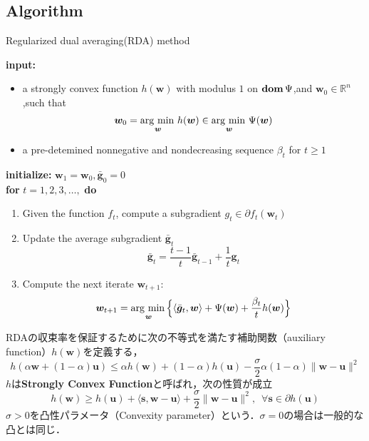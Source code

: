 \documentclass[a4paper,11pt]{jsarticle}
\numberwithin{theorem}{section}  %
\numberwithin{equation}{section} %
\newcommand{\argmin}{\mathop{\rm arg~min\,}\limits}
\newcommand{\dom}{\mathop{\mathrm{\bf dom}}\nolimits}
\begin{document}
\subsection{Algorithm}
\begin{algorithm}[H]
\caption{Regularized dual averaging(RDA) method}
\label{RDAA}
\textbf{input:}
\begin{itemize}
\item a strongly convex function $h(\bm{w})$ with modulus $1$ on $\dom \Psi$,and $\bm{w}_0 \in \mathbb{R}^n$,such that
\begin{equation}
\bm{w}_0 = \argmin_{\bm{w}} h(\bm{w}) \in \argmin_{\bm{w}} \Psi(\bm{w})
\end{equation}
\item a pre-detemined nonnegative and nondecreasing sequence $\beta_t$ for $t \ge 1$
\end{itemize}
\textbf{initialize:} $\bm{w}_1 = \bm{w}_0, \bar{\bm{g}}_0 = 0$\\
\textbf{for} $t=1,2,3,\dots,$ \textbf{do}
\begin{enumerate}
\item Given the function $f_t$, compute a subgradient $g_t \in \partial f_t(\bm{w}_t)$
\item Update the average subgradient $\bar{\bm{g}}_t$
\begin{equation}
\bar{\bm{g}}_t = \frac{t-1}{t} \bar{\bm{g}}_{t-1} + \frac{1}{t}\bm{g}_t
\end{equation}
\item Compute the next iterate $\bm{w}_{t+1}$:
\begin{equation}
\bm{w}_{t+1} = \argmin_{\bm{w}}\Bigr\{\langle \bar{\bm{g}}_t, \bm{w} \rangle + \Psi(\bm{w}) + \frac{\beta_t}{t} h(\bm{w}) \Bigr\} \label{EQU8}
\end{equation}
\end{enumerate}

\end{algorithm}

RDAの収束率を保証するために次の不等式を満たす補助関数（auxiliary function）$h(\bm{w})$を定義する，
\begin{equation}
h(\alpha\bm{w} + (1-\alpha)\bm{u}) \le \alpha h(\bm{w}) + (1-\alpha)h(\bm{u}) - \frac{\sigma}{2}\alpha(1-\alpha)\| \bm{w} - \bm{u} \|^2
\end{equation}
$h$は\textbf{Strongly Convex Function}と呼ばれ，次の性質が成立
\begin{equation}
h(\bm{w}) \ge h(\bm{u}) + \langle \bm{s}, \bm{w} - \bm{u} \rangle + \frac{\sigma}{2}\| \bm{w} - \bm{u} \|^2, \,\,\, \forall \bm{s} \in \partial h(\bm{u})
\end{equation}
$\sigma>0$を凸性パラメータ（Convexity parameter）という．$\sigma = 0$の場合は一般的な凸とは同じ．
\end{document}

